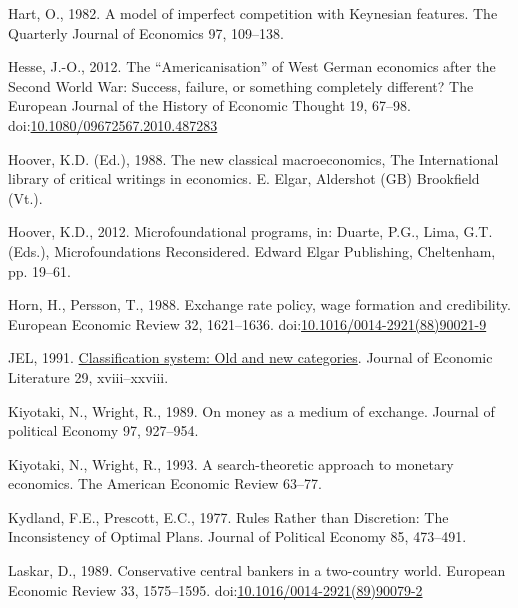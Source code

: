 \documentclass[
  12pt,
  onecolumn]{article}
\newlength{\cslhangindent}
\newlength{\cslentryspacingunit} %
\newenvironment{CSLReferences}[2] %
 {%
  \setlength{\parindent}{0pt}
  \ifodd #1
  \let\oldpar\par
  \def\par{\hangindent=\cslhangindent\oldpar}
  \fi
  \setlength{\parskip}{#2\cslentryspacingunit}
 }%
 {}
\begin{document}
\begin{CSLReferences}{1}{0}
\leavevmode{}%
Hart, O., 1982. A model of imperfect competition with {Keynesian}
features. The Quarterly Journal of Economics 97, 109--138.

\leavevmode{}%
Hesse, J.-O., 2012. The {``{Americanisation}''} of {West German}
economics after the {Second World War}: {Success}, failure, or something
completely different? The European Journal of the History of Economic
Thought 19, 67--98.
doi:\href{https://doi.org/10.1080/09672567.2010.487283}{10.1080/09672567.2010.487283}

\leavevmode{}%
Hoover, K.D. (Ed.), 1988. The new classical macroeconomics, The
{International} library of critical writings in economics. E. Elgar,
Aldershot (GB) Brookfield (Vt.).

\leavevmode{}%
Hoover, K.D., 2012. Microfoundational programs, in: Duarte, P.G., Lima,
G.T. (Eds.), Microfoundations {Reconsidered}. Edward Elgar Publishing,
Cheltenham, pp. 19--61.

\leavevmode{}%
Horn, H., Persson, T., 1988. Exchange rate policy, wage formation and
credibility. European Economic Review 32, 1621--1636.
doi:\href{https://doi.org/10.1016/0014-2921(88)90021-9}{10.1016/0014-2921(88)90021-9}

\leavevmode{}%
JEL, 1991. \href{https://www.jstor.org/stable/2727351}{Classification
system: Old and new categories}. Journal of Economic Literature 29,
xviii--xxviii.

\leavevmode{}%
Kiyotaki, N., Wright, R., 1989. On money as a medium of exchange.
Journal of political Economy 97, 927--954.

\leavevmode{}%
Kiyotaki, N., Wright, R., 1993. A search-theoretic approach to monetary
economics. The American Economic Review 63--77.

\leavevmode{}%
Kydland, F.E., Prescott, E.C., 1977. Rules {Rather} than {Discretion}:
{The Inconsistency} of {Optimal Plans}. Journal of Political Economy 85,
473--491.

\leavevmode{}%
Laskar, D., 1989. Conservative central bankers in a two-country world.
European Economic Review 33, 1575--1595.
doi:\href{https://doi.org/10.1016/0014-2921(89)90079-2}{10.1016/0014-2921(89)90079-2}


\end{CSLReferences}
\end{document}
